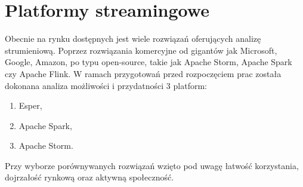 \section{Platformy streamingowe}

Obecnie na rynku dostępnych jest wiele rozwiązań oferujących analizę strumieniową.
Poprzez rozwiązania komercyjne od gigantów jak Microsoft, Google, Amazon,
po typu open-source,
takie jak Apache Storm, Apache Spark czy Apache Flink.
W ramach przygotowań przed rozpoczęciem prac została dokonana analiza
możliwości i przydatności 3 platform:
\begin{enumerate}
	\item Esper,
	\item Apache Spark,
	\item Apache Storm.
\end{enumerate}
Przy wyborze porównywanych rozwiązań wzięto pod uwagę
łatwość korzystania,
dojrzałość rynkową
oraz aktywną społeczność.




